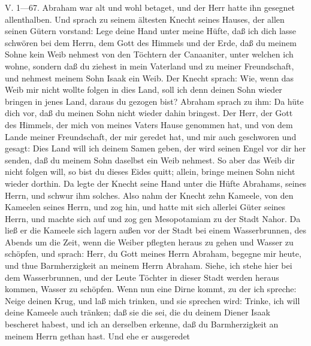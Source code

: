 V. 1—67. Abraham war alt und wohl betaget, und der Herr hatte ihn gesegnet allenthalben. Und sprach zu seinem ältesten Knecht seines Hauses, der allen seinen Gütern vorstand: Lege deine Hand unter meine Hüfte, daß ich dich lasse schwören bei dem Herrn, dem Gott des Himmels und der Erde, daß du meinem Sohne kein Weib nehmest von den Töchtern der Canaaniter, unter welchen ich wohne, sondern daß du ziehest in mein Vaterland und zu meiner Freundschaft, und nehmest meinem Sohn Isaak ein Weib. Der Knecht sprach: Wie, wenn das Weib mir nicht wollte folgen in dies Land, soll ich denn deinen Sohn wieder bringen in jenes Land, daraus du gezogen bist? Abraham sprach zu ihm: Da hüte dich vor, daß du meinen Sohn nicht wieder dahin bringest. Der Herr, der Gott des Himmels, der mich von meines Vaters Hause genommen hat, und von dem Lande meiner Freundschaft, der mir geredet hat, und mir auch geschworen und gesagt: Dies Land will ich deinem Samen geben, der wird seinen Engel vor dir her senden, daß du meinem Sohn daselbst ein Weib nehmest. So aber das Weib dir nicht folgen will, so bist du dieses Eides quitt; allein, bringe meinen Sohn nicht wieder dorthin. Da legte der Knecht seine Hand unter die Hüfte Abrahams, seines Herrn, und schwur ihm solches. Also nahm der Knecht zehn Kameele, von den Kameelen seines Herrn, und zog hin, und hatte mit sich allerlei Güter seines Herrn, und machte sich auf und zog gen Mesopotamiam zu der Stadt Nahor. Da ließ er die Kameele sich lagern außen vor der Stadt bei einem Wasserbrunnen, des Abends um die Zeit, wenn die Weiber pflegten heraus zu gehen und Wasser zu schöpfen, und sprach: Herr, du Gott meines Herrn Abraham, begegne mir heute, und thue Barmherzigkeit an meinem Herrn Abraham. Siehe, ich stehe hier bei dem Wasserbrunnen, und der Leute Töchter in dieser Stadt werden heraus kommen, Wasser zu schöpfen. Wenn nun eine Dirne kommt, zu der ich spreche: Neige deinen Krug, und laß mich trinken, und sie sprechen wird: Trinke, ich will deine Kameele auch tränken; daß sie die sei, die du deinem Diener Isaak bescheret habest, und ich an derselben erkenne, daß du Barmherzigkeit an meinem Herrn gethan hast. Und ehe er ausgeredet

